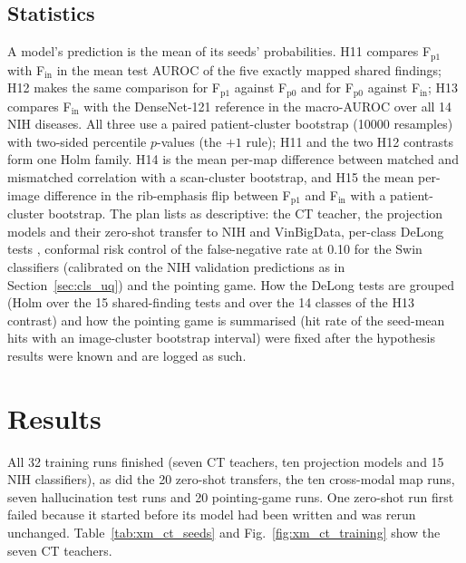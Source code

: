 \subsection{Statistics}
\label{sec:xm_stats}
A model's prediction is the mean of its seeds' probabilities. H11 compares F$_\mathrm{p1}$ with F$_\mathrm{in}$ in the mean test AUROC of
the five exactly mapped shared findings; H12 makes the same comparison for F$_\mathrm{p1}$ against F$_\mathrm{p0}$ and for F$_\mathrm{p0}$
against F$_\mathrm{in}$; H13 compares F$_\mathrm{in}$ with the DenseNet-121 reference in the macro-AUROC over all 14 NIH diseases. All
three use a paired patient-cluster bootstrap (\num{10000} resamples) with two-sided percentile $p$-values (the $+1$ rule); H11 and the two
H12 contrasts form one Holm family. H14 is the mean per-map difference between matched and mismatched correlation with a scan-cluster
bootstrap, and H15 the mean per-image difference in the rib-emphasis flip between F$_\mathrm{p1}$ and F$_\mathrm{in}$ with a
patient-cluster bootstrap. The plan lists as descriptive: the CT teacher, the projection models and their zero-shot transfer to NIH and
VinBigData, per-class DeLong tests \citep{delong1988auc}, conformal risk control of the false-negative rate at 0.10
\citep{angelopoulos2022crc} for the Swin classifiers (calibrated on the NIH validation predictions as in Section~\ref{sec:cls_uq}) and the
pointing game. How the DeLong tests are grouped (Holm over the 15 shared-finding tests and over the 14 classes of the H13 contrast) and how
the pointing game is summarised (hit rate of the seed-mean hits with an image-cluster bootstrap interval) were fixed after the hypothesis
results were known and are logged as such.

\section{Results}
\label{sec:xm_results}
All 32 training runs finished (seven CT teachers, ten projection models and 15 NIH classifiers), as did the 20 zero-shot transfers, the
ten cross-modal map runs, seven hallucination test runs and 20 pointing-game runs. One zero-shot run first failed because it started
before its model had been written and was rerun unchanged. Table~\ref{tab:xm_ct_seeds} and Fig.~\ref{fig:xm_ct_training} show the seven
CT teachers.

\begin{table}[htbp]
\centering\small
\caption{Every CT teacher run (unchanged recipe, 20 epochs): best validation and test macro-AUROC over the six findings of the CT subset.
Slot $k$ is the teacher of P1 seed $k$; seed 2 collapsed and seed 5 replaced it by the rule fixed beforehand.}
\label{tab:xm_ct_seeds}
\end{table}

